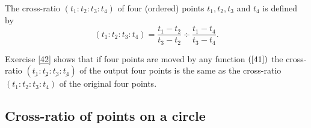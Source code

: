 \begin{definition}
\label{44}The cross-ratio $\left(  t_{1}:t_{2}:t_{3}:t_{4}\right)  $ of four
(ordered) points $t_{1},t_{2},t_{3}$ and $t_{4}$ is defined by%
\[
\left(  t_{1}:t_{2}:t_{3}:t_{4}\right)  =\frac{t_{1}-t_{2}}{t_{3}-t_{2}}%
\div\frac{t_{1}-t_{4}}{t_{3}-t_{4}}.
\]

\end{definition}

Exercise \ref{42} shows that if four points are moved by any function $\left(
\ref{41}\right)  $ the cross-ratio $\left(  \underline{t_{1}}:\underline
{t_{2}}:\underline{t_{3}}:\underline{t_{4}}\right)  $ of the output four
points is the same as the cross-ratio $\left(  t_{1}:t_{2}:t_{3}:t_{4}\right)
$ of the original four points.












\subsection*{Cross-ratio of points on a circle}

